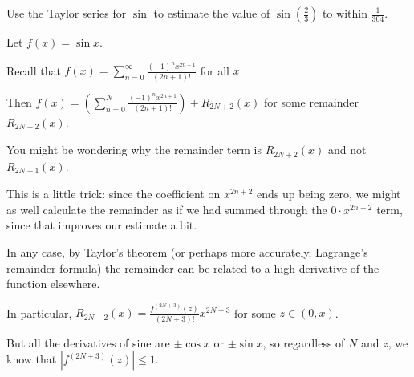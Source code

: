 \documentclass{ximera}
\begin{document}
            \begin{question}
              Use the Taylor series for \(\sin\) to estimate the value of \(\sin \left(\displaystyle\frac{2}{3}\right)\) to within \(\displaystyle\frac{1}{304}\).

              \begin{solution}
                \begin{hint}
                  Let \(f(x) = \sin x\).
                \end{hint}
                \begin{hint}
                  Recall that \(f(x) = \displaystyle\sum_{n=0}^\infty \displaystyle\frac{(-1)^n x^{2n+1}}{(2n+1)!}\) for all \(x\).
                \end{hint}
                \begin{hint}
                  Then \(f(x) = \left(\displaystyle\sum_{n=0}^{N} \displaystyle\frac{(-1)^n x^{2n+1}}{(2n+1)!}\right) + R_{2N+2}(x)\) for some remainder \(R_{2N+2}(x)\).
                \end{hint}
                \begin{hint}
                  You might be wondering why the remainder term is \(R_{2N+2}(x)\) and not \(R_{2N+1}(x)\).
                \end{hint}
                \begin{hint}
                  This is a little trick: since the coefficient on \(x^{2n+2}\) ends up being zero, we might as well calculate the remainder as if we had summed through the \(0 \cdot x^{2n+2}\) term, since that improves our estimate a bit.
                \end{hint}
                \begin{hint}
                  In any case, by Taylor's theorem (or perhaps more accurately, Lagrange's remainder formula) the remainder can be related to a high derivative of the function elsewhere.
                \end{hint}
                \begin{hint}
                  In particular, \(R_{2N+2}(x) = \displaystyle\frac{f^{(2N+3)}(z)}{(2N+3)!} x^{2N+3}\) for some \(z \in (0,x)\).
                \end{hint}
                \begin{hint}
                  But all the derivatives of sine are \(\pm \cos x\) or \(\pm \sin x\), so regardless of \(N\) and \(z\), we know that \(|f^{(2N+3)}(z)| \leq 1\).
                \end{hint}

\end{solution}
\end{question}
\end{document}

